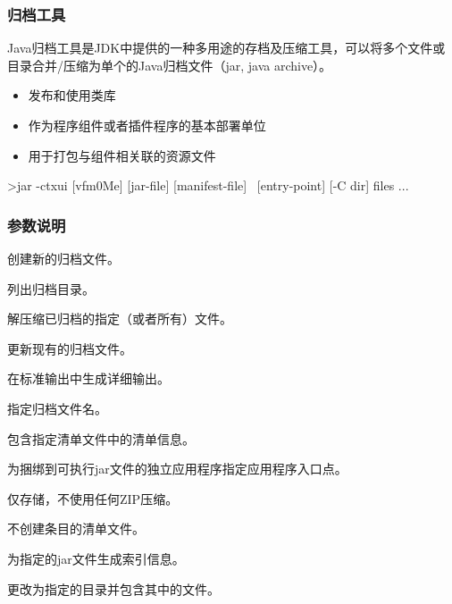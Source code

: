 \begin{frame}[fragile] %
  \frametitle{归档工具}

  Java归档工具是JDK中提供的一种多用途的存档及压缩工具，可以将多个文件或
  目录合并/压缩为单个的Java归档文件（jar, java archive）。

  \pause
  

  \begin{itemize}\kai
  \item 发布和使用类库
  \item 作为程序组件或者插件程序的基本部署单位
  \item 用于打包与组件相关联的资源文件
  \end{itemize}

  \pause
  

  \begin{shCode}
    >jar {-ctxui} [vfm0Me] [jar-file] [manifest-file] \  
    [entry-point] [-C dir] files ...
  \end{shCode}
\end{frame}

\begin{frame}[fragile] %
  \frametitle{参数说明}

  \begin{description}\kai
  \item[-c] 创建新的归档文件。
  \item[-t] 列出归档目录。
  \item[-x] 解压缩已归档的指定（或者所有）文件。
  \item[-u] 更新现有的归档文件。
  \item[-v] 在标准输出中生成详细输出。
  \item[-f] 指定归档文件名。
  \item[-m] 包含指定清单文件中的清单信息。
  \item[-e] 为捆绑到可执行jar文件的独立应用程序指定应用程序入口点。
  \item[-0] 仅存储，不使用任何ZIP压缩。
  \item[-M] 不创建条目的清单文件。
  \item[-i] 为指定的jar文件生成索引信息。
  \item[-C] 更改为指定的目录并包含其中的文件。
  \end{description}
\end{frame}


